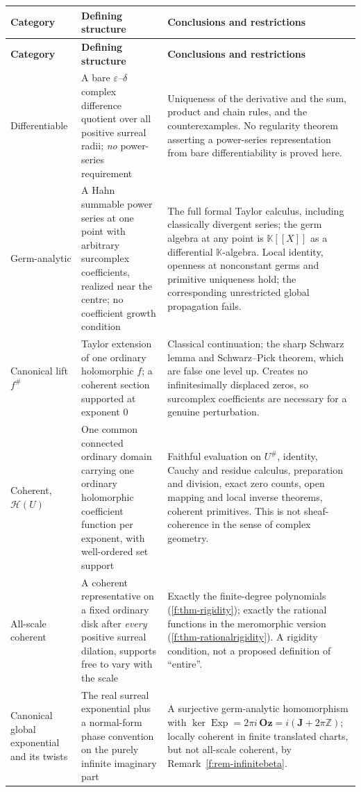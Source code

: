\documentclass[11pt,a4paper]{article}
\numberwithin{equation}{section}
\theoremstyle{definition}
\theoremstyle{remark}
\theoremstyle{plain}
\newcommand{\K}{\mathbb K}
\newcommand{\Oz}{\mathbf{Oz}}
\newcommand{\Jpi}{\mathbf J}
\newcommand{\ZZ}{\mathbb Z}
\DeclareMathOperator{\Exp}{Exp}
\newcommand{\halo}[1]{#1^{\#}}
\newcommand{\ev}[1]{#1^{\#}}
\newcommand{\Hc}{\mathcal H}
\begin{document}
\begin{center}\small
\begin{longtable}{@{}>{\raggedright\arraybackslash}p{}
                    >{\raggedright\arraybackslash}p{}
                    >{\raggedright\arraybackslash}p{}@{}}
\toprule
\textbf{Category} & \textbf{Defining structure} &
\textbf{Conclusions and restrictions}\\
\midrule
\endfirsthead
\toprule
\textbf{Category} & \textbf{Defining structure} &
\textbf{Conclusions and restrictions}\\
\midrule
\endhead
\bottomrule
\endfoot
Differentiable &
A bare $\varepsilon$--$\delta$ complex difference quotient over all
positive surreal radii; \emph{no} power-series requirement &
Uniqueness of the derivative and the sum, product and chain rules, and
the counterexamples. No regularity theorem asserting a power-series
representation from bare differentiability is proved here.\\[3pt]
Germ-analytic &
A Hahn summable power series at one point with arbitrary surcomplex
coefficients, realized near the centre; no coefficient growth condition &
The full formal Taylor calculus, including classically divergent
series; the germ algebra at any point is $\K[[X]]$ as a differential
$\K$-algebra. Local identity, openness at nonconstant germs and primitive
uniqueness hold; the corresponding unrestricted global propagation fails.\\[3pt]
Canonical lift $\ev f$ &
Taylor extension of one ordinary holomorphic $f$; a coherent section
supported at exponent $0$ &
Classical continuation; the sharp Schwarz lemma and Schwarz--Pick
theorem, which are false one level up.  Creates no infinitesimally
displaced zeros, so surcomplex coefficients are necessary for a genuine
perturbation.\\[3pt]
Coherent, $\Hc(U)$ &
One common connected ordinary domain carrying one ordinary holomorphic
coefficient function per exponent, with well-ordered set support &
Faithful evaluation on $\halo U$, identity, Cauchy and residue
calculus, preparation and division, exact zero counts, open mapping and
local inverse theorems, coherent primitives.  This is not
sheaf-coherence in the sense of complex geometry.\\[3pt]
All-scale coherent &
A coherent representative on a fixed ordinary disk after \emph{every}
positive surreal dilation, supports free to vary with the scale &
Exactly the finite-degree polynomials
(\ref{f:thm-rigidity}); exactly the rational functions in the
meromorphic version (\ref{f:thm-rationalrigidity}).  A rigidity
condition, not a proposed definition of ``entire''.\\[3pt]
Canonical global exponential and its twists &
The real surreal exponential plus a normal-form phase convention on the
purely infinite imaginary part &
A surjective germ-analytic homomorphism with
$\ker\Exp=2\pi i\,\Oz=i(\Jpi+2\pi\ZZ)$; locally coherent in finite
translated charts, but not all-scale coherent, by
Remark~\ref{f:rem-infinitebeta}.\\
\end{longtable}
\end{center}
\end{document}
